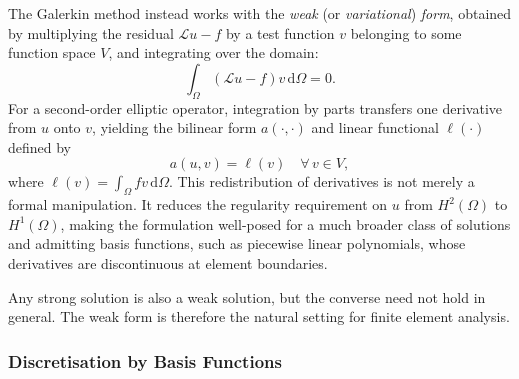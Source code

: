 \documentclass[12pt]{article}
\theoremstyle{definition}
\theoremstyle{remark}
\begin{document}
The Galerkin method instead works with the \emph{weak} (or \emph{variational})
\emph{form}, obtained by multiplying the residual $\mathcal{L}u - f$ by a test
function $v$ belonging to some function space $V$, and integrating over the
domain:
\begin{equation}
    \int_\Omega \left(\mathcal{L}u - f\right) v \,\mathrm{d}\Omega = 0.
\end{equation}
For a second-order elliptic operator, integration by parts transfers one
derivative from $u$ onto $v$, yielding the bilinear form $a(\cdot,\cdot)$ and
linear functional $\ell(\cdot)$ defined by
\begin{equation}
    a(u, v) = \ell(v) \quad \forall\, v \in V,
    \label{eq:weak_form}
\end{equation}
where $\ell(v) = \int_\Omega f v \,\mathrm{d}\Omega$. This redistribution of
derivatives is not merely a formal manipulation. It reduces the regularity
requirement on $u$ from $H^2(\Omega)$ to $H^1(\Omega)$, making the formulation
well-posed for a much broader class of solutions and admitting basis functions,
such as piecewise linear polynomials, whose derivatives are discontinuous at
element boundaries.

Any strong solution is also a weak solution, but the converse need not hold in
general. The weak form is therefore the natural setting for finite element
analysis.

\subsubsection{Discretisation by Basis Functions}\label{sec:discretisation}
\end{document}
